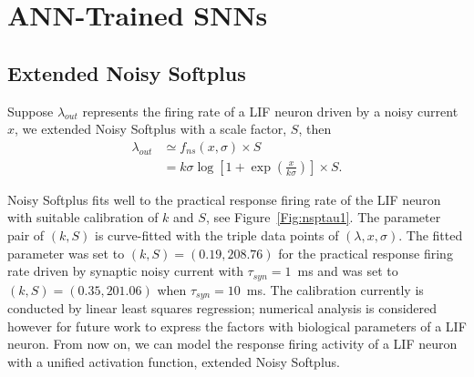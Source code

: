 \documentclass{article}
\begin{document}
\section{ANN-Trained SNNs}	

\subsection{Extended Noisy Softplus}
\label{sec:af_model}
Suppose $\lambda_{out}$ represents the firing rate  of a LIF neuron driven by a noisy current $x$, we extended Noisy Softplus\cite{Noisysoftplus} with a scale factor, $S$, then
\begin{equation}
\begin{aligned}
\lambda_{out} &\simeq f_{ns}(x, \sigma) \times S\\
&=k \sigma \log [1 + \exp(\frac{x}{k \sigma})] \times S.
\end{aligned}
\label{equ:fit}
\end{equation}	

Noisy Softplus fits well to the practical response firing rate of the LIF neuron with suitable calibration of $k$ and $S$, see Figure~\ref{Fig:nsptau1}.
The parameter pair of $(k, S)$ is curve-fitted with the triple data points of $(\lambda, x, \sigma)$.
The fitted parameter was set to $(k, S)=(0.19,208.76)$ for the practical response firing rate driven by synaptic noisy current with $\tau_{syn}=1$~ms and was set to $(k, S)=(0.35,201.06)$ when $\tau_{syn}=10$~ms.
The calibration currently is conducted by linear least squares regression; numerical analysis is considered however for future work to express the factors with biological parameters of a LIF neuron. From now on, we can model the response firing activity of a LIF neuron with a unified activation function, extended Noisy Softplus.
\end{document}
